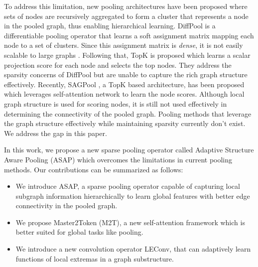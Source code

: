\documentclass[letterpaper]{article} \usepackage{aaai20}  \usepackage{times}  \usepackage{helvet} \usepackage{courier}  \usepackage[hyphens]{url}  \usepackage{graphicx} \urlstyle{rm} \def\UrlFont{\rm}  \usepackage{graphicx}  \frenchspacing  \setlength{\pdfpagewidth}{8.5in}  \setlength{\pdfpageheight}{11in}
\begin{document}
To address this limitation, new pooling architectures have been proposed where sets of nodes are recursively aggregated to form a cluster that represents a node in the pooled graph, thus enabling hierarchical learning. DiffPool \cite{diffpool} is a differentiable pooling operator that learns a soft assignment matrix mapping each node to a set of clusters. Since this assignment matrix is \emph{dense}, it is not easily scalable to large graphs \cite{topk2}. Following that, TopK \cite{topk} is proposed which learns a scalar projection score for each node and selects the top  nodes. They address the sparsity concerns of DiffPool but are unable to capture the rich graph structure effectively. Recently, SAGPool \cite{sag}, a TopK based architecture, has been proposed which leverages self-attention network to learn the node scores. Although local graph structure is used for scoring nodes, it is still not used effectively in determining the connectivity of the pooled graph. Pooling methods that leverage the graph structure effectively while maintaining sparsity currently don't exist. We address the gap in this paper.



In this work, we propose a new sparse pooling operator called Adaptive Structure Aware Pooling (ASAP) which overcomes the limitations in current pooling methods. Our contributions can be summarized as follows:
\begin{itemize}
	\item We introduce ASAP, a sparse pooling operator capable of capturing local subgraph information hierarchically to learn global features with better edge connectivity in the pooled graph.
	\item We propose Master2Token (M2T), a new self-attention framework which is better suited for global tasks like pooling.
	\item We introduce a new convolution operator LEConv, that can adaptively learn functions of local extremas in a graph substructure.
\end{itemize}



















 
\end{document}

